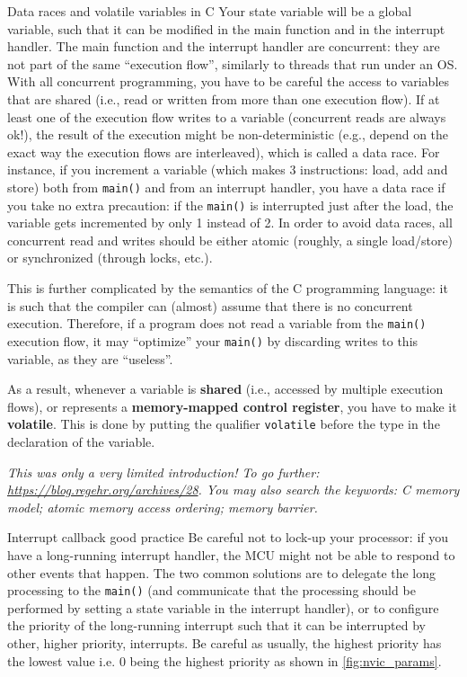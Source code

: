 \begin{bclogo}[couleur = gray!20, arrondi = 0.2, logo=\bcattention]{Data races and volatile variables in C}
Your state variable will be a global variable, such that it can be modified in the main function and in the interrupt handler.
The main function and the interrupt handler are concurrent: they are not part of the same ``execution flow'', similarly to threads that run under an OS.
With all concurrent programming, you have to be careful the access to variables that are shared (i.e., read or written from more than one execution flow).
If at least one of the execution flow writes to a variable (concurrent reads are always ok!), the result of the execution might be non-deterministic (e.g., depend on the exact way the execution flows are interleaved), which is called a data race.
For instance, if you increment a variable (which makes 3 instructions: load, add and store) both from \texttt{main()} and from an interrupt handler, you have a data race if you take no extra precaution: if the \texttt{main()} is interrupted just after the load, the variable gets incremented by only 1 instead of 2.
In order to avoid data races, all concurrent read and writes should be either atomic (roughly, a single load/store) or synchronized (through locks, etc.).

This is further complicated by the semantics of the C programming language: it is such that the compiler can (almost) assume that there is no concurrent execution.
Therefore, if a program does not read a variable from the \texttt{main()} execution flow, it may ``optimize'' your \texttt{main()} by discarding writes to this variable, as they are ``useless''.

As a result, whenever a variable is \textbf{shared} (i.e., accessed by multiple execution flows), or represents a \textbf{memory-mapped control register}, you have to make it \textbf{volatile}. This is done by putting the qualifier \texttt{volatile} before the type in the declaration of the variable.

\textit{This was only a very limited introduction! To go further: \url{https://blog.regehr.org/archives/28}. You may also search the keywords: C memory model; atomic memory access ordering; memory barrier.}
\end{bclogo}

\begin{bclogo}[couleur = gray!20, arrondi = 0.2, logo=\bcinfo]{Interrupt callback good practice}
Be careful not to lock-up your processor: if you have a long-running interrupt handler, the MCU might not be able to respond to other events that happen.
The two common solutions are to delegate the long processing to the \texttt{main()} (and communicate that the processing should be performed by setting a state variable in the interrupt handler), or to configure the priority of the long-running interrupt such that it can be interrupted by other, higher priority, interrupts. Be careful as usually, the highest priority has the lowest value i.e. 0 being the highest priority as shown in \autoref{fig:nvic_params}.
\end{bclogo}

